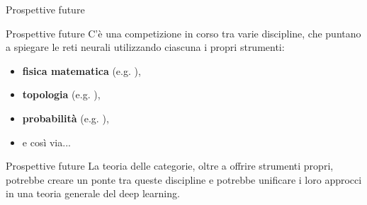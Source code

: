 \documentclass{beamer}
\begin{document}
\begin{frame}[standout]
    \huge Prospettive future
\end{frame}

\begin{frame}{Prospettive future}
    C'è una competizione in corso tra varie discipline, che puntano a spiegare le reti neurali utilizzando ciascuna i propri strumenti:
    \begin{itemize}
        \item<1-> \textbf{fisica matematica} {\footnotesize (e.g. \cite{roberts2022principles})},
        \item<2-> \textbf{topologia} {\footnotesize (e.g. \cite{hensel2021survey})},
        \item<3-> \textbf{probabilità} {\footnotesize (e.g. \cite{patel2015probabilistic})},
        \item<4-> e così via...
    \end{itemize}
    
\end{frame}

\begin{frame}{Prospettive future}
    La teoria delle categorie, oltre a offrire strumenti propri, potrebbe creare un ponte tra queste discipline e potrebbe unificare i loro approcci in una teoria generale del deep learning.
\end{frame}

\begin{frame}[allowframebreaks]
    \printbibliography
\end{frame}
\end{document}
